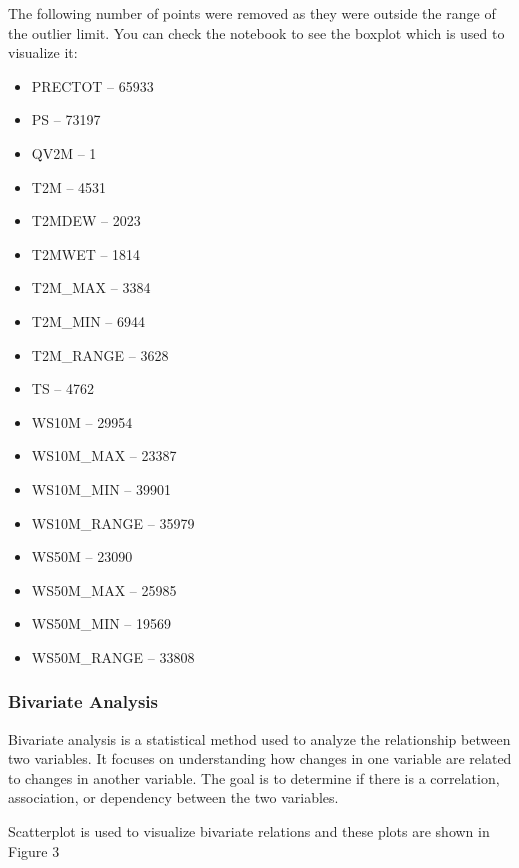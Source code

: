 \documentclass{article}
\begin{document}
The following number of points were removed as they were outside the range of the outlier limit. You can check the notebook to see the boxplot which is used to visualize it:
\begin{itemize}
    \item PRECTOT -- 65933
    \item PS -- 73197
    \item QV2M -- 1
    \item T2M -- 4531
    \item T2MDEW -- 2023
    \item T2MWET -- 1814
    \item T2M\_MAX -- 3384
    \item T2M\_MIN -- 6944
    \item T2M\_RANGE -- 3628
    \item TS -- 4762
    \item WS10M -- 29954
    \item WS10M\_MAX -- 23387
    \item WS10M\_MIN -- 39901
    \item WS10M\_RANGE -- 35979
    \item WS50M -- 23090
    \item WS50M\_MAX -- 25985
    \item WS50M\_MIN -- 19569
    \item WS50M\_RANGE -- 33808
\end{itemize}
\FloatBarrier

\subsubsection{Bivariate Analysis}

Bivariate analysis is a statistical method used to analyze the relationship between two variables. It focuses on understanding how changes in one variable are related to changes in another variable. The goal is to determine if there is a correlation, association, or dependency between the two variables.

Scatterplot is used to visualize bivariate relations and these plots are shown in Figure 3
\end{document}
